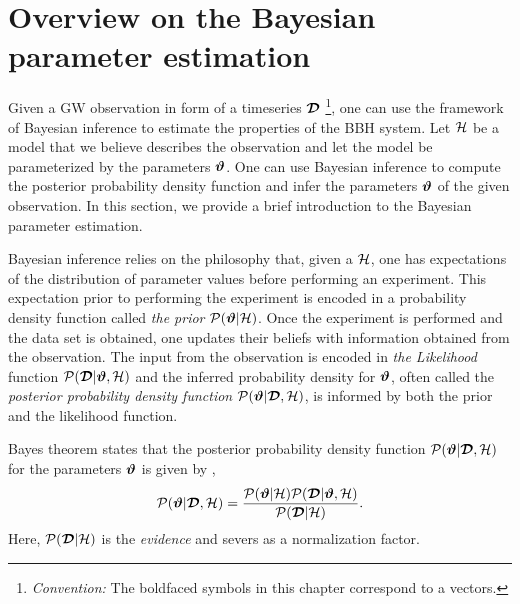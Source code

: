 \section{Overview on the Bayesian parameter estimation}
\label{sec:OverviewPE}
Given a GW observation in form of a timeseries $\boldsymbol{\mathcal{D}}$ \footnote{\textit{Convention: } The boldfaced symbols in this chapter correspond to a vectors.  }, one can use the framework of Bayesian inference to estimate the properties of the BBH system. Let $\mathcal{H}$ be a model that we believe describes the observation and let the model be parameterized by the parameters $\boldsymbol{\vartheta}$. One can use Bayesian inference to compute the posterior probability density function and infer the parameters $\boldsymbol{\vartheta}$ of the given observation. In this section, we provide a brief introduction to the Bayesian parameter estimation. 

Bayesian inference relies on the philosophy that, given a $\mathcal{H}$, one has expectations of the distribution of parameter values before performing an experiment. This expectation prior to performing the experiment is encoded in a probability density function called \textit{the prior}  $\mathcal{P}(\boldsymbol{\vartheta}|\mathcal{H})$. Once the experiment is performed and the data set is obtained, one updates their beliefs with information obtained from the observation. The input from the observation is encoded in \textit{the Likelihood }function $\mathcal{P}(\boldsymbol{\mathcal{D}}|\boldsymbol{\vartheta},\mathcal{H})$ and the inferred probability density for $\boldsymbol{\vartheta}$, often called the \textit{posterior probability density function} $\mathcal{P}(\boldsymbol{\vartheta}|\boldsymbol{\mathcal{D}},\mathcal{H})$, is informed by both the prior and the likelihood function.




Bayes theorem states that the posterior probability density function $\mathcal{P}(\boldsymbol{\vartheta}|\boldsymbol{\mathcal{D}},\mathcal{H})$ for the parameters $\boldsymbol{\vartheta}$ is given by \cite{BayesBooks1,BayesBooks2}, 
\begin{align}
\label{eq:bayes_thrm}
\mathcal{P}(\boldsymbol{\vartheta}|\boldsymbol{\mathcal{D}},\mathcal{H}) = \frac{\mathcal{P}(\boldsymbol{\vartheta}|\mathcal{H}) \mathcal{P}(\boldsymbol{\mathcal{D}}|\boldsymbol{\vartheta},\mathcal{H})}{\mathcal{P}(\boldsymbol{\mathcal{D}}|\mathcal{H})}.
\end{align}
Here, $\mathcal{P}(\boldsymbol{\mathcal{D}}|\mathcal{H})$ is the \textit{evidence} and severs as a normalization factor. 

